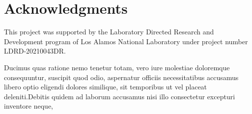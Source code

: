 \documentclass[letterpaper]{article} %
\begin{document}


\section{Acknowledgments}
This project was supported by the Laboratory Directed Research and Development program of Los Alamos National Laboratory under project number LDRD-20210043DR.


Ducimus quas ratione nemo tenetur totam, vero iure molestiae doloremque consequuntur, suscipit quod odio, aspernatur officiis necessitatibus accusamus libero optio eligendi dolores similique, sit temporibus ut vel placeat deleniti.Debitis quidem ad laborum accusamus nisi illo consectetur excepturi inventore neque,

\end{document}
